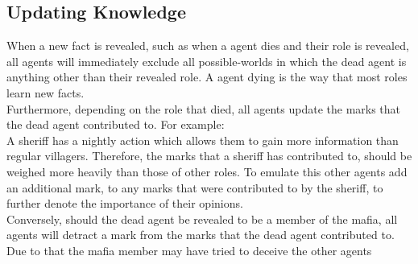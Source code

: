\subsection{Updating Knowledge}\label{UpdatingKnowledge}
When a new fact is revealed, such as when a agent dies and their role is
revealed, all agents will immediately exclude all possible-worlds in which the
dead agent is anything other than their revealed role. A agent dying is the
way that most roles learn new facts.\\ Furthermore, depending on the role that
died, all agents update the marks that the dead agent contributed to. For
example:\\ A sheriff has a nightly action which allows them to gain more
information than regular villagers. Therefore, the marks that a sheriff has
contributed to, should be weighed more heavily than those of other roles. To
emulate this other agents add an additional mark, to any marks that were
contributed to by the sheriff, to further denote the importance of their
opinions. \\ Conversely, should the dead agent be revealed to be a member of
the mafia, all agents will detract a mark from the marks that the dead agent
contributed to. Due to that the mafia member may have tried to deceive the
other agents
